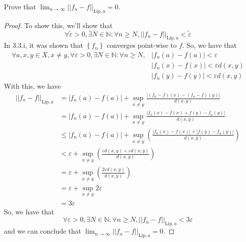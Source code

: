 \documentclass{article}
\newcommand{\norm}[1]{\left|\left|#1\right|\right|}
\newcommand{\abs}[1]{\left|#1\right|}
\newcommand{\parens}[1]{\left(#1\right)}
\newcommand{\bracks}[1]{\left\{#1\right\}}
\newcommand{\vep}{\varepsilon}
\newcommand{\N}{\mathbb{N}}
\begin{document}
            \item Prove that $\lim_{n\to\infty}\norm{f_n - f}_{
            \text{Lip},a} = 0$.
            \begin{proof}
            To show this, we'll show that 
            $$\forall \tilde{\vep} >0, \exists N \in \N: \forall n
            \geq N, \norm{f_n - f}_{\text{Lip}, a} < \tilde{\vep}$$
            In 3.3.i, it was shown that $\bracks{f_n}$ converges 
            point-wise to $f$. So, we have that 
            \begin{align*}
            \forall a,x,y \in X, x\neq y, \forall \vep > 0, 
            \exists N \in \N : \forall n \geq N, & \abs{f_n(a) - 
            f(a)} < \vep\\
            & \abs{f_n(x) - f(x)} < \vep d(x,y)\\
            & \abs{f_n(y) - f(y)} < \vep d(x,y)
            \end{align*}
            With this, we have
            \begin{align*}
            \norm{f_n - f}_{\text{Lip},a} &= \abs{f_n(a) - f(a)} +
            \sup_{x\neq y}\frac{\abs{\parens{f_n - f}(x) - 
            \parens{f_n - f}(y)}}{d(x,y)} \\
            &= \abs{f_n(a) - f(a)} +
            \sup_{x\neq y}\frac{\abs{f_n(x) - f(x) + f(y) - f_n(y)}}
            {d(x,y)} \\
            &\leq \abs{f_n(a) - f(a)} +
            \sup_{x\neq y}\parens{\frac{\abs{f_n(x) - f(x)} + 
            \abs{f(y) - f_n(y)}}
            {d(x,y)}} \\
            &< \vep +
            \sup_{x\neq y}\parens{\frac{\vep d(x,y) + \vep d(x,y)}
            {d(x,y)}} \\
            &= \vep + \sup_{x\neq y}\parens{\frac{2\vep d(x,y)}
            {d(x,y)}} \\
            &= \vep + \sup_{x\neq y}2\vep \\
            &= 3\vep
            \end{align*}
            So, we have that
            $$\forall \vep >0, \exists N \in \N: \forall n
            \geq N, \norm{f_n - f}_{\text{Lip}, a} < 3\vep$$
            and we can conclude that $\lim_{n\to\infty}
            \norm{f_n - f}_{\text{Lip},a} = 0$.
            \end{proof}
            
\end{document}
